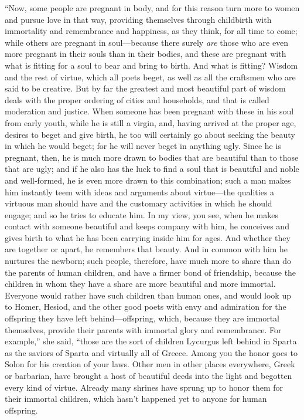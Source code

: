 “Now, some people are pregnant in body, and for this reason turn more to
women and pursue love in that way, providing themselves through
childbirth with immortality and remembrance and happiness, as they
think, for all time to come; while others are pregnant in soul---because
there  surely {\em are} those who are even more pregnant
in their souls than in their bodies, and these are pregnant with what is
fitting for a soul to bear and bring to birth. And what is fitting?
Wisdom and the rest of virtue, which all poets beget, as well as all the
craftsmen who are said to be creative. But by far the greatest and most
beautiful part of wisdom deals with the proper ordering of cities and
households, and that is called moderation and justice. When someone has
been pregnant with these in his soul from  early youth, while he
is still a virgin, and, having arrived at the proper age, desires to
beget and give birth, he too will certainly go about seeking the beauty
in which he would beget; for he will never beget in anything ugly. Since
he is pregnant, then, he is much more drawn to bodies that are beautiful
than to those that are ugly; and if he also has the luck to find a soul
that is beautiful and noble and well-formed, he is even more drawn
 to this combination; such a man makes him instantly teem with
ideas and arguments about virtue---the qualities a virtuous man should
have and the customary activities in which he should engage; and so he
tries to educate him. In my view, you see, when he makes contact with
someone beautiful and keeps company with him, he conceives and gives
birth to what he has been carrying inside him for ages. And whether they
are together or apart, he remembers that beauty. And in common with him
he nurtures the newborn; such people, therefore, have much more to share
than do the parents of human children, and have a firmer bond of
friendship, because the children in whom they have a share are more
 beautiful and more immortal. Everyone would rather have such
children than human ones, and would look up to Homer, Hesiod, and the
other good poets with envy and admiration for the offspring they have
left behind---offspring, which, because they are immortal themselves,
provide their parents with immortal glory and remembrance. For example,”
she said, “those are the sort of children
Lycurgus left behind
in Sparta as the saviors of Sparta and virtually all of Greece. Among
you the honor goes  to Solon for his creation of your laws. Other
men in other places everywhere, Greek or barbarian, have brought a host
of beautiful deeds into the light and begotten every kind of virtue.
Already many shrines have sprung up to honor them for their immortal
children, which hasn’t happened yet to anyone for human offspring.

